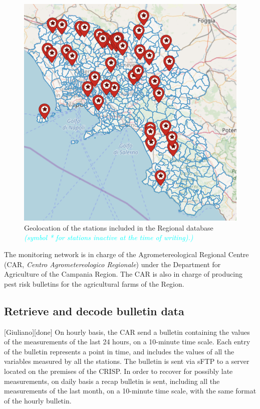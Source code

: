 \documentclass[authoryear,preprint,review,12pt]{elsarticle}
\newcommand{\review}[1]{\emph{\textcolor{cyan}{#1}}}
\begin{document}
\begin{figure}
	\centering
	\includegraphics[scale=.8]{figures/rarLocations}
	\caption{ Geolocation of the stations included in the Regional database \review{(symbol * for stations inactive at the time of writing).)}}
	\label{fig:rarLocations}
\end{figure}

The monitoring network is in charge of the Agrometereological Regional Centre (CAR, \emph{Centro Agrometereologico Regionale}) under the Department for Agriculture of the Campania Region. The CAR is also in charge of producing pest risk bulletins for the agricultural farms of the Region.

\subsection{Retrieve and decode bulletin data}[Giuliano][done]
On hourly basis, the CAR send a bulletin containing the values of the measurements of the last 24 hours, on a 10-minute time scale. Each entry of the bulletin represents a point in time, and includes the values of all the variables measured by all the stations. The bulletin is sent via sFTP to a server located on the premises of the CRISP.
In order to recover for possibly late measurements, on daily basis a recap bulletin is sent, including all the measurements of the last month, on a 10-minute time scale, with the same format of the hourly bulletin.
\end{document}
